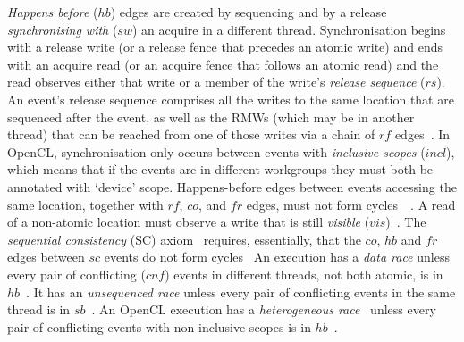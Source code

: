 \emph{Happens before} ($hb$) edges are created by sequencing and by a
release \emph{synchronising with} ($sw$) an acquire in a different
thread. Synchronisation begins with a release write (or a release
fence that precedes an atomic write) and ends with an acquire read (or
an acquire fence that follows an atomic read) and the read observes
either that write or a member of the write's \emph{release sequence}
($rs$). An event's release sequence comprises all the writes to the
same location that are sequenced after the event, as well as the RMWs
(which may be in another thread) that can be reached from one of those
writes via a chain of $rf$ edges~\cite[\S4.3]{vafeiadis+15}. In
OpenCL, synchronisation only occurs between events with
\emph{inclusive scopes} ($incl$), which means that if the events are
in different workgroups they must both be annotated with `device' scope.
Happens-before edges between events accessing the same location,
together with $rf$, $co$, and $fr$ edges, must not form
cycles~~\cite[\S5.3]{vafeiadis+15}. A read of a
non-atomic location must observe a write that is still \emph{visible}
($vis$)~. The \emph{sequential consistency} (SC)
axiom~ requires, essentially, that the $co$, $hb$
and $fr$ edges between $sc$ events do not form
cycles~\cite[\S3.2]{batty+16} An execution has a \emph{data race}
unless every pair of conflicting ($cnf$) events in different threads,
not both atomic, is in $hb$~. It has an
\emph{unsequenced race} unless every pair of conflicting events in the
same thread is in $sb$~. An OpenCL execution has a
\emph{heterogeneous race}~\cite{hower+14} unless every pair of
conflicting events with non-inclusive scopes is in
$hb$~.


